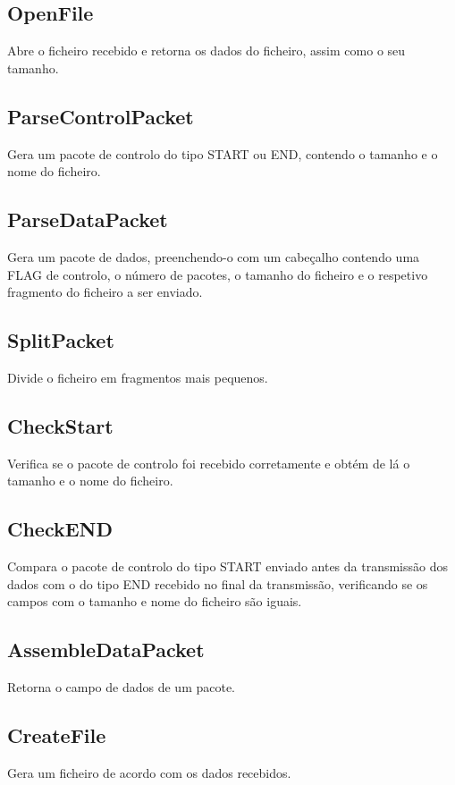 \documentclass{article}
\begin{document}
\subsection{OpenFile}
Abre o ficheiro recebido e retorna os dados do ficheiro, assim como o seu tamanho.

\subsection{ParseControlPacket}
Gera um pacote de controlo do tipo START ou END, contendo o tamanho e o nome do ficheiro.

\subsection{ParseDataPacket}
Gera um pacote de dados, preenchendo-o com um cabeçalho contendo uma FLAG de controlo, o número de pacotes, o tamanho do ficheiro e o respetivo fragmento do ficheiro a ser enviado.

\subsection{SplitPacket}
Divide o ficheiro em fragmentos mais pequenos.

\subsection{CheckStart}
Verifica se o pacote de controlo foi recebido corretamente e obtém de lá o tamanho e o nome do ficheiro.

\subsection{CheckEND}
Compara o pacote de controlo do tipo START enviado antes da transmissão dos dados com o do tipo END recebido no final da transmissão, verificando se os campos com o tamanho e nome do ficheiro são iguais.

\subsection{AssembleDataPacket}
Retorna o campo de dados de um pacote.

\subsection{CreateFile}
Gera um ficheiro de acordo com os dados recebidos.
\end{document}
